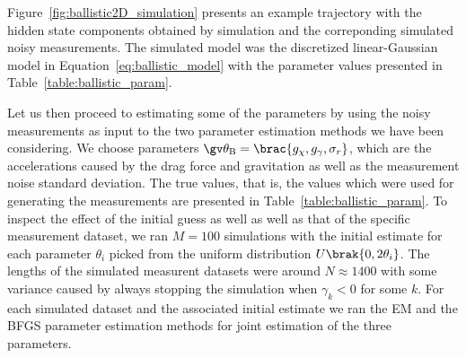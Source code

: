 Figure~\ref{fig:ballistic2D_simulation} presents an example trajectory with
the hidden state components obtained by simulation and the correponding
simulated noisy measurements. The simulated model was the discretized
linear-Gaussian model in Equation~\eqref{eq:ballistic_model} with  
the parameter values presented in Table~\ref{table:ballistic_param}.

\begin{table}[htbp]
\caption{Parameter values used for simulation in Section~\ref{sec:ballistic}}
\label{table:ballistic_param}
\centering
\footnotesize
{}
\end{table}

Let us then proceed to estimating some of the parameters by using the noisy
measurements as input to the two parameter estimation methods we have been considering.
We choose parameters $\Th_{\mathrm{B}}=\brac{g_\chi,g_\gamma,\sigma_r}$, which are the
accelerations caused by the drag force and gravitation as well as the measurement noise
standard deviation. The true values, that is, the values which were used for generating the
measurements are presented in Table~\ref{table:ballistic_param}. To inspect the effect of
the initial guess as well as well as that of the specific measurement dataset, we ran
$M=100$ simulations with the initial estimate for each parameter $\theta_i$ picked 
from the uniform distribution $U\brak{0,2\theta_i}$. The lengths of the simulated measurent
datasets were around $N\approx 1400$ with some variance caused by always stopping
the simulation when $\gamma_k<0$ for some $k$. For each simulated dataset and the associated
initial estimate we ran the EM and the BFGS parameter estimation methods for joint estimation
of the three parameters. 


